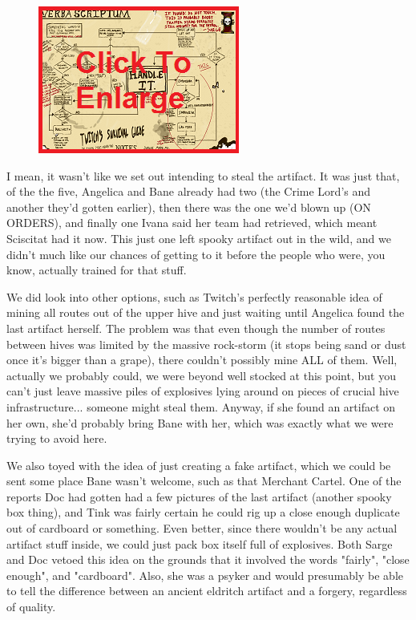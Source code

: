 \begin{figure}
	\begin{center}
		\includegraphics[width=\figwidth]{pics/19/30.png}
	\end{center}
\end{figure}
I mean, it wasn't like we set out intending to steal the artifact. 
It was just that, of the the five, Angelica and Bane already had two (the Crime Lord's and another they'd gotten earlier), then there was the one we'd blown up (ON ORDERS), and finally one Ivana said her team had retrieved, which meant Sciscitat had it now. 
This just one left spooky artifact out in the wild, and we didn't much like our chances of getting to it before the people who were, you know, actually trained for that stuff.

We did look into other options, such as Twitch's perfectly reasonable idea of mining all routes out of the upper hive and just waiting until Angelica found the last artifact herself. 
The problem was that even though the number of routes between hives was limited by the massive rock-storm (it stops being sand or dust once it's bigger than a grape), there couldn't possibly mine ALL of them. 
Well, actually we probably could, we were beyond well stocked at this point, but you can't just leave massive piles of explosives lying around on pieces of crucial hive infrastructure... 
someone might steal them. 
Anyway, if she found an artifact on her own, she'd probably bring Bane with her, which was exactly what we were trying to avoid here.

We also toyed with the idea of just creating a fake artifact, which we could be sent some place Bane wasn't welcome, such as that Merchant Cartel. 
One of the reports Doc had gotten had a few pictures of the last artifact (another spooky box thing), and Tink was fairly certain he could rig up a close enough duplicate out of cardboard or something. 
Even better, since there wouldn't be any actual artifact stuff inside, we could just pack box itself full of explosives. 
Both Sarge and Doc vetoed this idea on the grounds that it involved the words "fairly", "close enough", and "cardboard". 
Also, she was a psyker and would presumably be able to tell the difference between an ancient eldritch artifact and a forgery, regardless of quality. 


